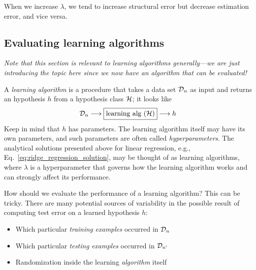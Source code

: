 When we increase $\lambda$, we tend to increase structural error  but
decrease estimation error, and vice versa.


\subsection{Evaluating learning algorithms}

{\em Note that this section is relevant to learning algorithms
  generally---we are just introducing the topic here since we now have
  an algorithm that can be evaluated!}

\vskip0.2in

A {\em learning algorithm} is a procedure that takes a data set
${\cal D}_n$ as input and returns an hypothesis $h$ from a hypothesis
class ${\cal H}$; it looks like
\begin{equation*}
  {\cal D}_n \longrightarrow \boxed{\text{learning alg (${\cal H}$)}} \longrightarrow h
\end{equation*}
%
Keep in mind that $h$ has parameters. The learning algorithm itself may have its own parameters, and such
parameters are often called {\em hyperparameters}.  The analytical
solutions presented above for linear regression,
e.g., Eq.~\ref{eq:ridge_regression_solution}, may be thought of as
learning algorithms, where $\lambda$ is a hyperparameter that governs
how the learning algorithm works and can strongly affect its performance.

How should we evaluate the performance of a {learning algorithm}?
This can be tricky.  There are many potential sources of variability in
the possible result of computing test error on a learned hypothesis $h$:
\begin{itemize}
  \item Which particular {\em training examples} occurred in ${\cal D}_n$
  \item Which particular {\em testing examples} occurred in ${\cal D}_{n'}$
  \item Randomization inside the learning {\em algorithm} itself
\end{itemize}

